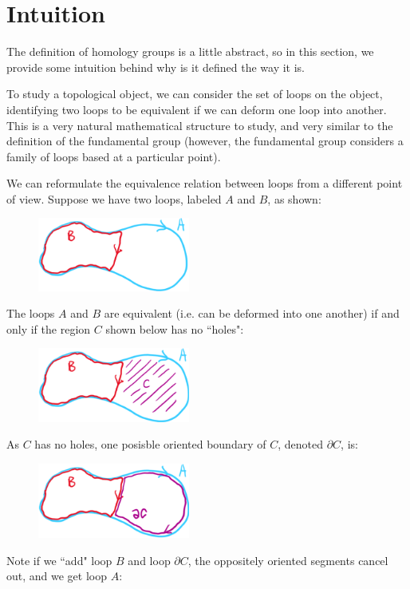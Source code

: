 \section{Intuition}
The definition of homology groups is a little abstract, so in this section, we provide some intuition behind why is it defined the way it is.

To study a topological object, we can consider the set of loops on the object, identifying two loops to be equivalent if we can deform one loop into another. This is a very natural mathematical structure to study, and very similar to the definition of the fundamental group (however, the fundamental group considers a family of loops based at a particular point).

We can reformulate the equivalence relation between loops from a different point of view. Suppose we have two loops, labeled $A$ and $B$, as shown:
\begin{figure}[H]
    \includegraphics[width=5cm]{figures/intuition-1}
    \centering
\end{figure}
The loops $A$ and $B$ are equivalent (i.e. can be deformed into one another) if and only if the region $C$ shown below has no ``holes":
\begin{figure}[H]
    \includegraphics[width=5cm]{figures/intuition-2}
    \centering
\end{figure}
As $C$ has no holes, one posisble oriented boundary of $C$, denoted $\partial C$, is:
\begin{figure}[H]
    \includegraphics[width=5cm]{figures/intuition-3}
    \centering
\end{figure}
Note if we ``add" loop $B$ and loop $\partial C$, the oppositely oriented segments cancel out, and we get loop $A$:

